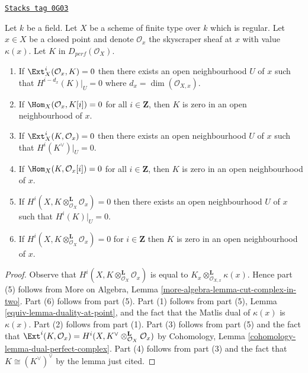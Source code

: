 \begin{lemma}
\label{equiv-lemma-orthogonal-point-sheaf}
\href{https://stacks.math.columbia.edu/tag/0G03}{\texttt{Stacks tag 0G03}}

Let $k$ be a field. Let $X$ be a scheme of finite type over $k$ which
is regular. Let $x \in X$ be a closed point and denote $\mathcal{O}_x$
the skyscraper sheaf at $x$ with value $\kappa(x)$. Let $K$ in
$D_{perf}(\mathcal{O}_X)$.
\begin{enumerate}
\item If $\Ext^i_X(\mathcal{O}_x, K) = 0$ then there exists an open
neighbourhood $U$ of $x$ such that $H^{i - d_x}(K)|_U = 0$ where
$d_x = \dim(\mathcal{O}_{X, x})$.
\item If $\Hom_X(\mathcal{O}_x, K[i]) = 0$ for all
$i \in \mathbf{Z}$, then $K$ is zero in an open neighbourhood of $x$.
\item If $\Ext^i_X(K, \mathcal{O}_x) = 0$ then there exists an open
neighbourhood $U$ of $x$ such that $H^i(K^\vee)|_U = 0$.
\item If $\Hom_X(K, \mathcal{O}_x[i]) = 0$ for all
$i \in \mathbf{Z}$, then $K$ is zero in an open neighbourhood of $x$.
\item If $H^i(X, K \otimes_{\mathcal{O}_X}^\mathbf{L} \mathcal{O}_x) = 0$
then there exists an open neighbourhood $U$ of $x$ such that
$H^i(K)|_U = 0$.
\item If $H^i(X, K \otimes_{\mathcal{O}_X}^\mathbf{L} \mathcal{O}_x) = 0$
for $i \in \mathbf{Z}$ then $K$ is zero in an
open neighbourhood of $x$.
\end{enumerate}
\end{lemma}

\begin{proof}

Observe that $H^i(X, K \otimes_{\mathcal{O}_X}^\mathbf{L} \mathcal{O}_x)$
is equal to $K_x  \otimes_{\mathcal{O}_{X, x}}^\mathbf{L} \kappa(x)$.
Hence part (5) follows from More on Algebra, Lemma
\ref{more-algebra-lemma-cut-complex-in-two}.
Part (6) follows from part (5).
Part (1) follows from part (5), Lemma \ref{equiv-lemma-duality-at-point}, and the
fact that the Matlis dual of $\kappa(x)$ is $\kappa(x)$.
Part (2) follows from part (1).
Part (3) follows from part (5) and the fact that
$\Ext^i(K, \mathcal{O}_x) =
H^i(X, K^\vee \otimes_{\mathcal{O}_X}^\mathbf{L} \mathcal{O}_x)$ by
Cohomology, Lemma \ref{cohomology-lemma-dual-perfect-complex}.
Part (4) follows from part (3) and the fact that $K \cong (K^\vee)^\vee$
by the lemma just cited.
\end{proof}

